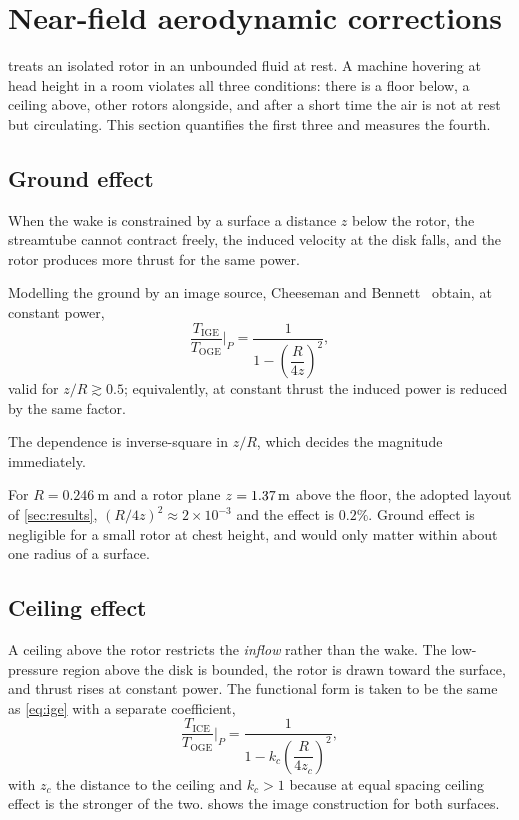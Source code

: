﻿\section{Near-field aerodynamic corrections}
\label{sec:nearfield}

 treats an isolated rotor in an unbounded fluid at rest. A
machine hovering at head height in a room violates all three conditions: there
is a floor below, a ceiling above, other rotors alongside, and after a short
time the air is not at rest but circulating. This section quantifies the first
three and measures the fourth.

\subsection{Ground effect}

When the wake is constrained by a surface a distance $z$ below the rotor, the
streamtube cannot contract freely, the induced velocity at the disk falls, and
the rotor produces more thrust for the same power.

\begin{model}
\label{mod:ige}
Modelling the ground by an image source, Cheeseman and
Bennett~\cite{cheeseman1955} obtain, at constant power,
\begin{equation}
  \frac{T_{\mathrm{IGE}}}{T_{\mathrm{OGE}}}\bigg|_{P}
  = \frac{1}{1-\left(\dfrac{R}{4z}\right)^{2}} ,
  \label{eq:ige}
\end{equation}
valid for $z/R \gtrsim 0.5$; equivalently, at constant thrust the induced power
is reduced by the same factor.
\end{model}

The dependence is inverse-square in $z/R$, which decides the magnitude
immediately.

\begin{example}
For $R=\SI{0.246}{\metre}$ and a rotor plane $z=\SI{1.37}{\metre}$
above the floor, the adopted layout of \cref{sec:results},
$(R/4z)^2 \approx 2\times10^{-3}$ and the effect is $0.2\%$. Ground effect
is negligible for a small rotor at chest height, and would only matter within
about one radius of a surface.
\end{example}

\subsection{Ceiling effect}

A ceiling above the rotor restricts the \emph{inflow} rather than the wake. The
low-pressure region above the disk is bounded, the rotor is drawn toward the
surface, and thrust rises at constant power. The functional form is taken to be
the same as \cref{eq:ige} with a separate coefficient,
\begin{equation}
  \frac{T_{\mathrm{ICE}}}{T_{\mathrm{OGE}}}\bigg|_{P}
  = \frac{1}{1-k_c\left(\dfrac{R}{4z_c}\right)^{2}} ,
  \label{eq:ice}
\end{equation}
with $z_c$ the distance to the ceiling and $k_c>1$ because at equal spacing
ceiling effect is the stronger of the two.  shows the image
construction for both surfaces.

